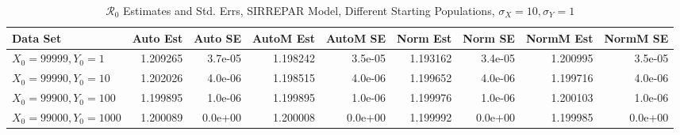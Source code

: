 \documentclass[12pt]{article}
\newcommand{\rr}{\ensuremath{\mathcal{R}_0}}
\begin{document}
\begin{table}[H]
	
	\caption{$\rr$ Estimates and Std. Errs, SIRREPAR Model,
		Different Starting Populations, 
		$\sigma_X = 10, \sigma_Y = 1$}
	\begin{footnotesize}
		\hskip -1.7cm
		\begin{tabular}{l|r|r|r|r|r|r|r|r}
			\hline
			Data Set & Auto Est & Auto SE & AutoM Est & AutoM SE & Norm Est & Norm SE & NormM Est & NormM SE\\
			\hline
			$X_0 = 99999, Y_0 = 1$ & 1.209265 & 3.7e-05 & 1.198242 & 3.5e-05 & 1.193162 & 3.4e-05 & 1.200995 & 3.5e-05\\
			\hline
			$X_0 = 99990, Y_0 = 10$ & 1.202026 & 4.0e-06 & 1.198515 & 4.0e-06 & 1.199652 & 4.0e-06 & 1.199716 & 4.0e-06\\
			\hline
			$X_0 = 99900, Y_0 = 100$ & 1.199895 & 1.0e-06 & 1.199895 & 1.0e-06 & 1.199976 & 1.0e-06 & 1.200103 & 1.0e-06\\
			\hline
			$X_0 = 99000, Y_0 = 1000$ & 1.200089 & 0.0e+00 & 1.200008 & 0.0e+00 & 1.199992 & 0.0e+00 & 1.199985 & 0.0e+00\\
			\hline
		\end{tabular}
	\end{footnotesize}
\end{table}
\end{document}
